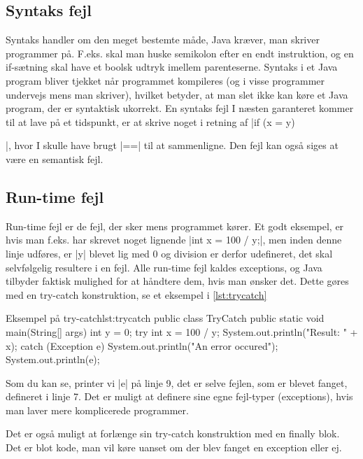 {\subsection{Syntaks fejl}
Syntaks handler om den meget bestemte måde, Java kræver, man skriver programmer på. F.eks. skal man huske semikolon efter en endt instruktion, og en if-sætning skal have et boolsk udtryk imellem parenteserne. Syntaks i et Java program bliver tjekket når programmet kompileres (og i visse programmer undervejs mens man skriver), hvilket betyder, at man slet ikke kan køre et Java program, der er syntaktisk ukorrekt. En syntaks fejl I næsten garanteret kommer til at lave på et tidspunkt, er at skrive noget i retning af \JavaInline|if (x = y) {|, hvor I skulle have brugt \JavaInline|==| til at sammenligne. Den fejl kan også siges at være en semantisk fejl.

\subsection{Run-time fejl}
Run-time fejl er de fejl, der sker mens programmet kører. Et godt eksempel, er hvis man f.eks. har skrevet noget lignende \JavaInline|int x = 100 / y;|, men inden denne linje udføres, er \JavaInline|y| blevet lig med 0 og division er derfor udefineret, det skal selvfølgelig resultere i en fejl. Alle run-time fejl kaldes exceptions, og Java tilbyder faktisk mulighed for at håndtere dem, hvis man ønsker det. Dette gøres med en try-catch konstruktion, se et eksempel i \autoref{lst:trycatch}

\begin{JavaCode}{Eksempel på try-catch}{lst:trycatch}
	public class TryCatch {
		public static void main(String[] args) {
			int y = 0;
			try {
				int x = 100 / y;
				System.out.println("Result: " + x); 
			} catch (Exception e) {
				System.out.println("An error occured");
				System.out.println(e);
			}
		}
	}
	
\end{JavaCode}

\begin{remark}
	Som du kan se, printer vi \JavaInline|e| på linje 9, det er selve fejlen, som er blevet fanget, defineret i linje 7. Det er muligt at definere sine egne fejl-typer (exceptions), hvis man laver mere komplicerede programmer.
	
	Det er også muligt at forlænge sin try-catch konstruktion med en finally blok. Det er blot kode, man vil køre uanset om der blev fanget en exception eller ej.
\end{remark}

}}
